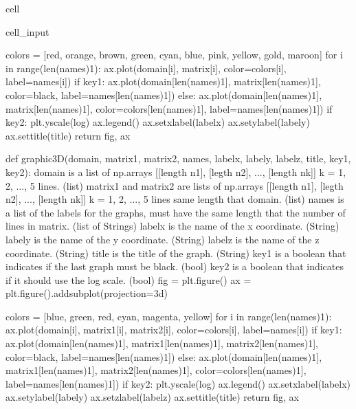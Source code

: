 \documentclass[letterpaper,10pt,english]{jupyterBook}
\begin{document}
\begin{sphinxuseclass}{cell}
\begin{sphinxVerbatimInput}
\begin{sphinxuseclass}{cell_input}
\begin{sphinxVerbatim}[commandchars=\\\{\}]
  colors = [\PYGZsq{}red\PYGZsq{}, \PYGZsq{}orange\PYGZsq{}, \PYGZsq{}brown\PYGZsq{}, \PYGZsq{}green\PYGZsq{}, \PYGZsq{}cyan\PYGZsq{}, \PYGZsq{}blue\PYGZsq{}, \PYGZsq{}pink\PYGZsq{}, \PYGZsq{}yellow\PYGZsq{}, \PYGZsq{}gold\PYGZsq{}, \PYGZsq{}maroon\PYGZsq{}]
  for i in range(len(names)\PYGZhy{}1):
    ax.plot(domain[i], matrix[i], color=colors[i], label=names[i])
  if key1:
    ax.plot(domain[len(names)\PYGZhy{}1], matrix[len(names)\PYGZhy{}1], color=\PYGZsq{}black\PYGZsq{}, label=names[len(names)\PYGZhy{}1])
  else:
    ax.plot(domain[len(names)\PYGZhy{}1], matrix[len(names)\PYGZhy{}1], color=colors[len(names)\PYGZhy{}1], label=names[len(names)\PYGZhy{}1])
  if key2:
    plt.yscale(\PYGZsq{}log\PYGZsq{})
  ax.legend()
  ax.set\PYGZus{}xlabel(labelx)
  ax.set\PYGZus{}ylabel(labely)
  ax.set\PYGZus{}title(title)
  return fig, ax

def graphic\PYGZus{}3D(domain, matrix1, matrix2, names, labelx, labely, labelz, title, key1, key2):
  \PYGZsq{}\PYGZsq{}\PYGZsq{}
  domain is a list of np.arrays [[length n1], [legth n2], ..., [length nk]]
  k = 1, 2, ..., 5 lines. (list)
  matrix1 and matrix2 are lists of np.arrays [[length n1], [legth n2], ..., [length nk]]
  k = 1, 2, ..., 5 lines \PYGZhy{} same length that domain. (list)
  names is a list of the labels for the graphs, must have the same length that
  the number of lines in matrix. (list of Strings)
  labelx is the name of the x coordinate. (String)
  labely is the name of the y coordinate. (String)
  labelz is the name of the z coordinate. (String)
  title is the title of the graph. (String)
  key1 is a boolean that indicates if the last graph must be black. (bool)
  key2 is a boolean that indicates if it should use the log scale. (bool)
  \PYGZsq{}\PYGZsq{}\PYGZsq{}
  fig = plt.figure()
  ax = plt.figure().add\PYGZus{}subplot(projection=\PYGZsq{}3d\PYGZsq{})

  colors = [\PYGZsq{}blue\PYGZsq{}, \PYGZsq{}green\PYGZsq{}, \PYGZsq{}red\PYGZsq{}, \PYGZsq{}cyan\PYGZsq{}, \PYGZsq{}magenta\PYGZsq{}, \PYGZsq{}yellow\PYGZsq{}]
  for i in range(len(names)\PYGZhy{}1):
    ax.plot(domain[i], matrix1[i], matrix2[i], color=colors[i], label=names[i])
  if key1:
    ax.plot(domain[len(names)\PYGZhy{}1], matrix1[len(names)\PYGZhy{}1], matrix2[len(names)\PYGZhy{}1], color=\PYGZsq{}black\PYGZsq{}, label=names[len(names)\PYGZhy{}1])
  else:
    ax.plot(domain[len(names)\PYGZhy{}1], matrix1[len(names)\PYGZhy{}1], matrix2[len(names)\PYGZhy{}1], color=colors[len(names)\PYGZhy{}1], label=names[len(names)\PYGZhy{}1])
  if key2:
    plt.yscale(\PYGZsq{}log\PYGZsq{})
  ax.legend()
  ax.set\PYGZus{}xlabel(labelx)
  ax.set\PYGZus{}ylabel(labely)
  ax.set\PYGZus{}zlabel(labelz)
  ax.set\PYGZus{}title(title)
  return fig, ax


\end{sphinxVerbatim}
\end{sphinxuseclass}
\end{sphinxVerbatimInput}
\end{sphinxuseclass}
\end{document}
